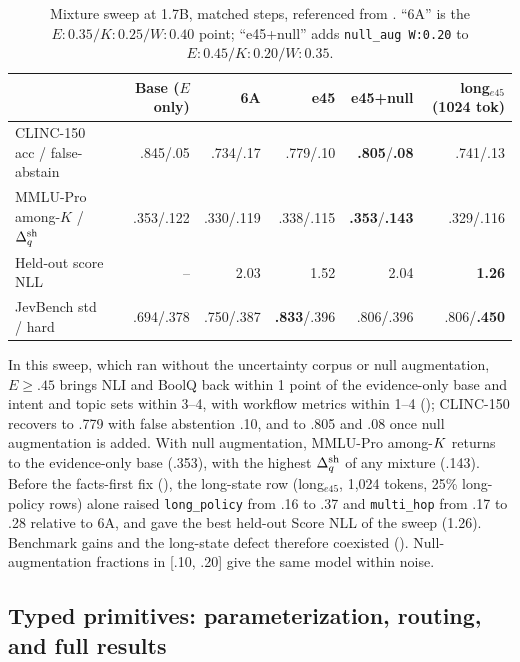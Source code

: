 \begin{table}[h]
  \centering
  \caption{Mixture sweep at 1.7B, matched steps, referenced from . ``6A'' is the
  $E{:}0.35/K{:}0.25/W{:}0.40$ point; ``e45+null'' adds \texttt{null\_aug W:0.20} to
  $E{:}0.45/K{:}0.20/W{:}0.35$.}
  \label{tab:app-mixture}
  \small
  \setlength{\tabcolsep}{4pt}
  \begin{tabular}{lrrrrr}
    \toprule
    & Base ($E$ only) & 6A & e45 & \textbf{e45+null} & long$_{e45}$ (1024 tok) \\
    \midrule
    CLINC-150 acc / false-abstain & .845/.05 & .734/.17 & .779/.10 & \textbf{.805}/\textbf{.08} & .741/.13 \\
    MMLU-Pro among-$K$ / $\Delta_q^{\mathrm{sh}}$ & .353/.122 & .330/.119 & .338/.115 & \textbf{.353}/\textbf{.143} & .329/.116 \\
    Held-out score NLL & -- & 2.03 & 1.52 & 2.04 & \textbf{1.26} \\
    JevBench std / hard & .694/.378 & .750/.387 & \textbf{.833}/.396 & .806/.396 & .806/\textbf{.450} \\
    \bottomrule
  \end{tabular}
\end{table}

In this sweep, which ran without the uncertainty corpus or null augmentation, $E \ge .45$ brings NLI and
BoolQ back within 1 point of the evidence-only base and intent and topic sets within 3--4, with workflow
metrics within 1--4 (); CLINC-150 recovers to .779 with false abstention .10,
and to .805 and .08 once null augmentation is added. With null augmentation, MMLU-Pro among-$K$
returns to the evidence-only base (.353), with the highest $\Delta_q^{\mathrm{sh}}$ of any mixture (.143). Before the facts-first fix (), the long-state row (long$_{e45}$, 1{,}024 tokens,
25\% long-policy rows) alone raised \texttt{long\_policy} from .16 to .37 and \texttt{multi\_hop} from .17
to .28 relative to 6A, and gave the best held-out Score NLL of the sweep (1.26). Benchmark gains and the long-state defect therefore coexisted (). Null-augmentation
fractions in [.10, .20] give the same model within noise.

\subsection{Typed primitives: parameterization, routing, and full results}
\label{app:typed-primitives}

